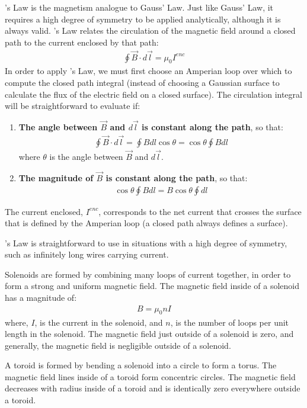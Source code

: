\begin{chapterSummary}
\ampere's Law is the magnetism analogue to Gauss' Law. Just like Gauss' Law, it requires a high degree of symmetry to be applied analytically, although it is always valid. \ampere's Law relates the circulation of the magnetic field around a closed path to the current enclosed by that path:
\begin{align*}
\oint \vec B \cdot d\vec l =\mu_0 I^{enc}
\end{align*}
In order to apply \ampere's Law, we must first choose an Amperian loop over which to compute the closed path integral (instead of choosing a Gaussian surface to calculate the flux of the electric field on a closed surface). The circulation integral will be straightforward to evaluate if:
\begin{enumerate}
\item \textbf{The angle between $\vec B$ and $d\vec l$ is constant along the path}, so that:
\begin{align*}
\oint  \vec B \cdot d\vec l = \oint B dl \cos\theta = \cos\theta \oint B dl
\end{align*}
where $\theta$ is the angle between $\vec B$ and $d\vec l$.
\item \textbf{The magnitude of $\vec B$ is constant along the path}, so that:
\begin{align*}
\cos\theta \oint B dl = B\cos\theta \oint dl
\end{align*}
\end{enumerate}
The current enclosed, $I^{enc}$, corresponds to the net current that crosses the surface that is defined by the Amperian loop (a closed path always defines a surface). 

\ampere's Law is straightforward to use in situations with a high degree of symmetry, such as infinitely long wires carrying current. 

Solenoids are formed by combining many loops of current together, in order to form a strong and uniform magnetic field. The magnetic field inside of a solenoid has a magnitude of:
\begin{align*}
B=\mu_0nI
\end{align*}
where, $I$, is the current in the solenoid, and $n$, is the number of loops per unit length in the solenoid.  The magnetic field just outside of a solenoid is zero, and generally, the magnetic field is negligible outside of a solenoid. 

A toroid is formed by bending a solenoid into a circle to form a torus. The magnetic field lines inside of a toroid form concentric circles. The magnetic field decreases with radius inside of a toroid and is identically zero everywhere outside a toroid.
\end{chapterSummary}

